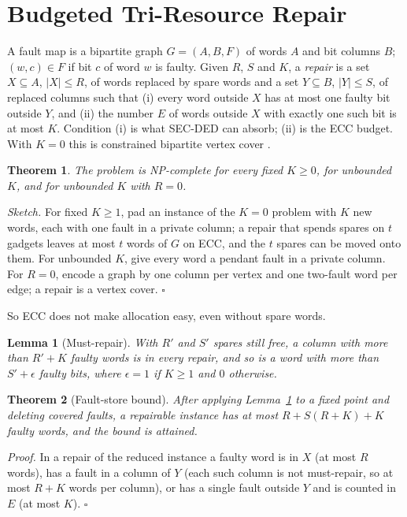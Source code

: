 \documentclass[conference]{IEEEtran}
\newtheorem{theorem}{Theorem}
\newtheorem{lemma}{Lemma}
\begin{document}
\section{Budgeted Tri-Resource Repair}\label{sec:theory}
A fault map is a bipartite graph $G=(A,B,F)$ of words $A$ and bit columns $B$; $(w,c)\in F$ if bit $c$
of word $w$ is faulty. Given $R$, $S$ and $K$, a \emph{repair} is a set $X\subseteq A$, $|X|\le R$, of
words replaced by spare words and a set $Y\subseteq B$, $|Y|\le S$, of replaced columns such that
(i) every word outside $X$ has at most one faulty bit outside $Y$, and (ii) the number $E$ of words
outside $X$ with exactly one such bit is at most $K$. Condition (i) is what SEC-DED can absorb;
(ii) is the ECC budget. With $K=0$ this is constrained bipartite vertex cover \cite{kuo1987,fernau2001,chen2003}.

\begin{theorem}\label{th:np}
The problem is NP-complete for every fixed $K\ge 0$, for unbounded $K$, and for unbounded $K$ with
$R=0$.
\end{theorem}
\emph{Sketch.} For fixed $K\ge1$, pad an instance of the $K=0$ problem with $K$ new words, each with
one fault in a private column; a repair that spends spares on $t$ gadgets leaves at most $t$ words of
$G$ on ECC, and the $t$ spares can be moved onto them. For unbounded $K$, give every word a pendant
fault in a private column. For $R=0$, encode a graph by one column per vertex and one two-fault word
per edge; a repair is a vertex cover. \hfill$\square$

So ECC does not make allocation easy, even without spare words.

\begin{lemma}[Must-repair]\label{lem:mr}
With $R'$ and $S'$ spares still free, a column with more than $R'+K$ faulty words is in every repair,
and so is a word with more than $S'+\epsilon$ faulty bits, where $\epsilon=1$ if $K\ge1$ and $0$
otherwise.
\end{lemma}

\begin{theorem}[Fault-store bound]\label{th:kernel}
After applying Lemma~\ref{lem:mr} to a fixed point and deleting covered faults, a repairable
instance has at most $R+S(R+K)+K$ faulty words, and the bound is attained.
\end{theorem}
\emph{Proof.} In a repair of the reduced instance a faulty word is in $X$ (at most $R$ words), has a
fault in a column of $Y$ (each such column is not must-repair, so at most $R+K$ words per column), or
has a single fault outside $Y$ and is counted in $E$ (at most $K$). \hfill$\square$
\end{document}
